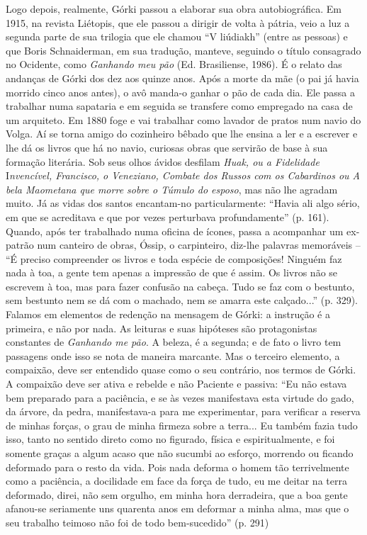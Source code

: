 Logo depois, realmente, Górki passou a elaborar sua obra autobiográfica.
Em 1915, na revista Liétopis, que ele passou a dirigir de volta à
pátria, veio a luz a segunda parte de sua trilogia que ele chamou ``V
liúdiakh'' (entre as pessoas) e que Boris Schnaiderman, em sua tradução,
manteve, seguindo o título consagrado no Ocidente, como \emph{Ganhando
meu pão} (Ed. Brasiliense, 1986). É o relato das andanças de Górki dos
dez aos quinze anos. Após a morte da mãe (o pai já havia morrido cinco
anos antes), o avô manda-o ganhar o pão de cada dia. Ele passa a
trabalhar numa sapataria e em seguida se transfere como empregado na
casa de um arquiteto. Em 1880 foge e vai trabalhar como lavador de
pratos num navio do Volga. Aí se torna amigo do cozinheiro bêbado que
lhe ensina a ler e a escrever e lhe dá os livros que há no navio,
curiosas obras que servirão de base à sua formação literária. Sob seus
olhos ávidos desfilam \emph{Huak, ou a Fidelidade} I\emph{nvencível,
Francisco, o Veneziano, Combate dos Russos com os Cabardinos ou A bela
Maometana que morre sobre o Túmulo do esposo}, mas não lhe agradam
muito. Já as vidas dos santos encantam-no particularmente: ``Havia ali
algo sério, em que se acreditava e que por vezes perturbava
profundamente'' (p. 161). Quando, após ter trabalhado numa oficina de
ícones, passa a acompanhar um ex-patrão num canteiro de obras, Óssip, o
carpinteiro, diz-lhe palavras memoráveis -- ``É preciso compreender os
livros e toda espécie de composições! Ninguém faz nada à toa, a gente
tem apenas a impressão de que é assim. Os livros não se escrevem à toa,
mas para fazer confusão na cabeça. Tudo se faz com o bestunto, sem
bestunto nem se dá com o machado, nem se amarra este calçado...'' (p.
329). Falamos em elementos de redenção na mensagem de Górki: a instrução
é a primeira, e não por nada. As leituras e suas hipóteses são
protagonistas constantes de \emph{Ganhando me pão}. A beleza, é a
segunda; e de fato o livro tem passagens onde isso se nota de maneira
marcante. Mas o terceiro elemento, a compaixão, deve ser entendido quase
como o seu contrário, nos termos de Górki. A compaixão deve ser ativa e
rebelde e não Paciente e passiva: ``Eu não estava bem preparado para a
paciência, e se às vezes manifestava esta virtude do gado, da árvore, da
pedra, manifestava-a para me experimentar, para verificar a reserva de
minhas forças, o grau de minha firmeza sobre a terra... Eu também fazia
tudo isso, tanto no sentido direto como no figurado, física e
espiritualmente, e foi somente graças a algum acaso que não sucumbi ao
esforço, morrendo ou ficando deformado para o resto da vida. Pois nada
deforma o homem tão terrivelmente como a paciência, a docilidade em face
da força de tudo, eu me deitar na terra deformado, direi, não sem
orgulho, em minha hora derradeira, que a boa gente afanou-se seriamente
uns quarenta anos em deformar a minha alma, mas que o seu trabalho
teimoso não foi de todo bem-sucedido'' (p. 291)

